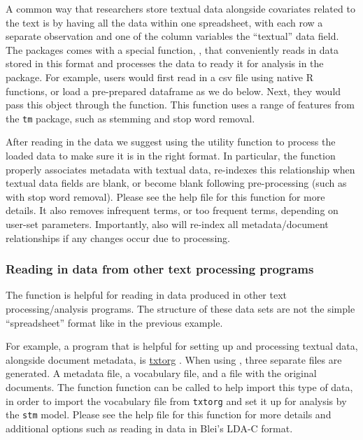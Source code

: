 \documentclass[nojss]{jss}
\begin{document}
A common way that researchers store textual data alongside covariates related to the text is by having all the data within one spreadsheet, with each row a separate observation and one of the column variables the ``textual'' data field. The  packages comes with a special function, , that conveniently reads in data stored in this format and processes the data to ready it for analysis in the  package.  For example, users would first read in a csv file using native R functions, or load a pre-prepared dataframe as we do below. Next, they would pass this object through the  function. This function uses a range of features from the \texttt{tm} package, such as stemming and stop word removal.

\begin{Schunk}
\end{Schunk}

After reading in the data we suggest using the utility function  to process the loaded data to make sure it is in the right format. In particular, the  function properly associates metadata with textual data, re-indexes this relationship when textual data fields are blank, or become blank following pre-processing (such as with stop word removal). Please see the help file for this function for more details. It also removes infrequent terms, or too frequent terms, depending on user-set parameters. Importantly,  also will re-index all metadata/document relationships if any changes occur due to processing.

\subsubsection{Reading in data from other text processing programs}

The  function is helpful for reading in data produced in other text processing/analysis programs. The structure of these data sets are not the simple ``spreadsheet'' format like in the previous example.

For example, a program that is helpful for setting up and processing textual data, alongside document metadata, is \href{www.txtorg.org}{txtorg} \citep{TextComparative}. When using , three separate files are generated. A metadata file, a vocabulary file, and a file with the original documents. The function  function can be called to help import this type of data, in order to import the vocabulary file from \texttt{txtorg} and set it up for analysis by the \texttt{stm} model. Please see the help file for this function for more details and additional options such as reading in data in Blei's LDA-C format.
\end{document}

